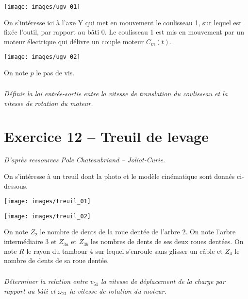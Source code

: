 \documentclass[10pt,fleqn]{article} %
\begin{document}
\begin{multicols}{2}
\begin{center}
\texttt{[image: images/ugv\_01]}
\end{center}

On s’intéresse ici à l’axe Y qui met en mouvement le coulisseau 1,
sur lequel est fixée l’outil, par rapport au bâti 0. Le coulisseau 1 est mis en mouvement par un moteur
électrique qui délivre un couple moteur $C_m(t)$.

\begin{center}
\texttt{[image: images/ugv\_02]}
\end{center}

On note $p$ le pas de vis. 


\subparagraph{}
\textit{Définir la loi entrée-sortie entre la vitesse de translation du coulisseau et la vitesse de rotation du moteur. }
\ifprof
\begin{corrige}
\end{corrige}
\else
\fi


\section*{Exercice 12 -- Treuil de levage}
\textit{D'après ressources Pole Chateaubriand -- Joliot-Curie.}
\setcounter{exo}{0}

On s’intéresse à un treuil dont la photo et le modèle cinématique sont donnés ci-dessous.
\begin{center}
\texttt{[image: images/treuil\_01]}
\end{center}

\begin{center}
\texttt{[image: images/treuil\_02]}
\end{center}

On note $Z_2$ le nombre de dents de la roue dentée de l'arbre 2. On note l'arbre intermédiaire 3 et $Z_{3a}$ et $Z_{3b}$ les nombres de dents de ses deux roues dentées. On note $R$ le rayon du tambour 4 sur lequel s’enroule sans glisser un câble et $Z_4$ le nombre de dents de sa roue dentée.


\subparagraph{}
\textit{Déterminer la relation entre $v_{51}$ la vitesse de déplacement de la charge par rapport au bâti et $\omega_{21}$ la vitesse de
rotation du moteur.}
\ifprof
\else
\end{multicols}
\fi
\end{document}
